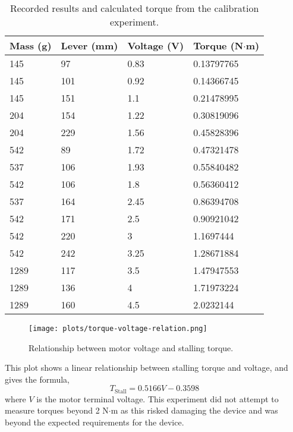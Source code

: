 \begin{table}[!ht]
	\centering
	\caption{Recorded results and calculated torque from the calibration experiment.}
	\label{voltage-torque-table}
	\begin{tabular}{|l|l|l|l|}
		\hline
		Mass (g) & Lever (mm) & Voltage (V) & Torque (N$\cdot$m) \\ \hline
		145 & 97 & 0.83 & 0.13797765 \\ \hline
		145 & 101 & 0.92 & 0.14366745 \\ \hline
		145 & 151 & 1.1 & 0.21478995 \\ \hline
		204 & 154 & 1.22 & 0.30819096 \\ \hline
		204 & 229 & 1.56 & 0.45828396 \\ \hline
		542 & 89 & 1.72 & 0.47321478 \\ \hline
		537 & 106 & 1.93 & 0.55840482 \\ \hline
		542 & 106 & 1.8 & 0.56360412 \\ \hline
		537 & 164 & 2.45 & 0.86394708 \\ \hline
		542 & 171 & 2.5 & 0.90921042 \\ \hline
		542 & 220 & 3 & 1.1697444 \\ \hline
		542 & 242 & 3.25 & 1.28671884 \\ \hline
		1289 & 117 & 3.5 & 1.47947553 \\ \hline
		1289 & 136 & 4 & 1.71973224 \\ \hline
		1289 & 160 & 4.5 & 2.0232144 \\ \hline
	\end{tabular}
\end{table}

\begin{figure}[!h]
	\centering
	\texttt{[image: plots/torque-voltage-relation.png]}
	\caption{Relationship between motor voltage and stalling torque.}
	\label{torque-voltage-plot}
\end{figure}

This plot shows a linear relationship between stalling torque and voltage, and gives the formula,
\begin{equation}
	T_\mathrm{Stall} =  0.5166 V - 0.3598 \label{eqTorqueVoltage}
\end{equation}
where $V$ is the motor terminal voltage.
This experiment did not attempt to measure torques beyond 2 N$\cdot$m as this risked damaging the device and was beyond the expected requirements for the device.



